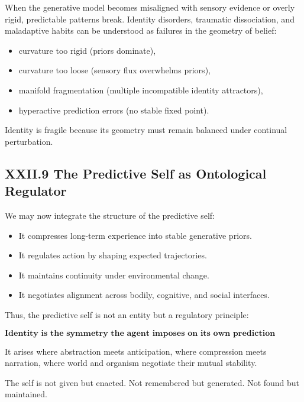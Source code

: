 \documentclass[12pt,letterpaper]{article}
\begin{document}
When the generative model becomes misaligned with sensory evidence or overly rigid, predictable patterns break. Identity disorders, traumatic dissociation, and maladaptive habits can be understood as failures in the geometry of belief:

\begin{itemize}
    \item curvature too rigid (priors dominate),
    \item curvature too loose (sensory flux overwhelms priors),
    \item manifold fragmentation (multiple incompatible identity attractors),
    \item hyperactive prediction errors (no stable fixed point).
\end{itemize}

Identity is fragile because its geometry must remain balanced under continual perturbation.

\subsection{XXII.9 The Predictive Self as Ontological Regulator}

We may now integrate the structure of the predictive self:

\begin{itemize}
    \item It compresses long-term experience into stable generative priors.
    \item It regulates action by shaping expected trajectories.
    \item It maintains continuity under environmental change.
    \item It negotiates alignment across bodily, cognitive, and social interfaces.
\end{itemize}

Thus, the predictive self is not an entity but a regulatory principle:

\[
\textbf{Identity is the symmetry the agent imposes on its own prediction errors.}
\]

It arises where abstraction meets anticipation, where compression meets narration, where world and organism negotiate their mutual stability.

The self is not given but enacted.  
Not remembered but generated.  
Not found but maintained.
\end{document}
